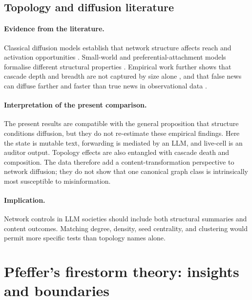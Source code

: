 \subsection{Topology and diffusion literature}

\paragraph{Evidence from the literature.}
Classical diffusion models establish that network structure affects reach and
activation opportunities \parencite{kempe2003influence}.  Small-world and
preferential-attachment models formalise different structural properties
\parencite{watts1998collective,barabasi1999emergence}.  Empirical work further
shows that cascade depth and breadth are not captured by size alone
\parencite{goel2016virality}, and that false news can diffuse farther and
faster than true news in observational data \parencite{vosoughi2018false}.

\paragraph{Interpretation of the present comparison.}
The present results are compatible with the general proposition that
structure conditions diffusion, but they do not re-estimate these empirical
findings.  Here the state is mutable text, forwarding is mediated by an LLM,
and live-cell \MI{} is an auditor output.  Topology effects are also entangled
with cascade death and composition.  The data therefore add a
content-transformation perspective to network diffusion; they do not show
that one canonical graph class is intrinsically most susceptible to
misinformation.

\paragraph{Implication.}
Network controls in LLM societies should include both structural summaries
and content outcomes.  Matching degree, density, seed centrality, and
clustering would permit more specific tests than topology names alone.

\section{Pfeffer's firestorm theory: insights and boundaries}
\label{sec:discussion-pfeffer}

